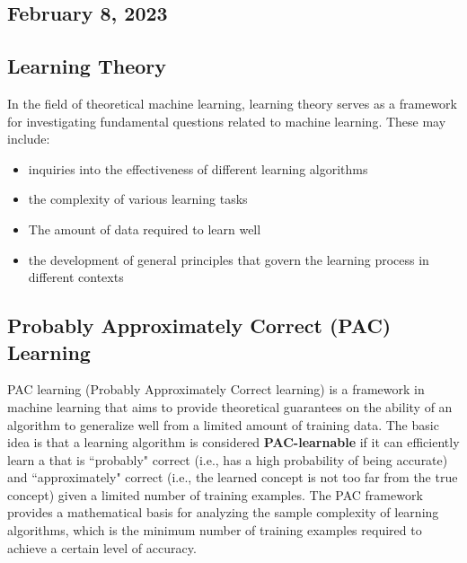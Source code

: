 \subsection{February 8, 2023}
\subsection{Learning Theory}
In the field of theoretical machine learning, learning theory serves as a framework for investigating fundamental questions related to machine learning. These may include:
\begin{itemize}
    \item inquiries into the effectiveness of different learning algorithms
    \item the complexity of various learning tasks
    \item The amount of data required to learn well
    \item the development of general principles that govern the learning process in different contexts
\end{itemize}
\subsection{Probably Approximately Correct (PAC) Learning}

PAC learning (Probably Approximately Correct learning) is a framework in machine learning that aims to provide theoretical guarantees on the ability of an algorithm to generalize well from a limited amount of training data.
The basic idea is that a learning algorithm is considered \textbf{PAC-learnable} if it can efficiently learn a  that is ``probably" correct (i.e., has a high probability of being accurate) and ``approximately" correct (i.e., the learned concept is not too far from the true concept) given a limited number of training examples. The PAC framework provides a mathematical basis for analyzing the sample complexity of learning algorithms, which is the minimum number of training examples required to achieve a certain level of accuracy. 

